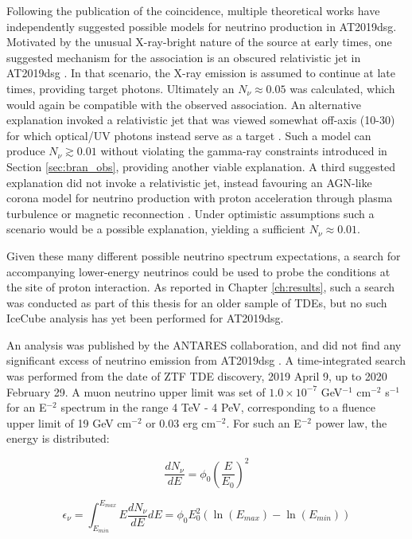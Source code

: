 Following the publication of the coincidence, multiple theoretical works have independently suggested possible models for neutrino production in AT2019dsg. Motivated by the unusual X-ray-bright nature of the source at early times, one suggested mechanism for the association is an obscured relativistic jet in AT2019dsg . In that scenario, the X-ray emission is assumed to continue at late times, providing target photons. Ultimately an $N_{\nu} \approx 0.05$ was calculated, which would again be compatible with the observed association. An alternative explanation invoked a relativistic jet that was viewed somewhat off-axis (10-30\arcdeg) for which optical/UV photons instead serve as a target . Such a model can produce $N_{\nu} \gtrsim 0.01$ without violating the gamma-ray constraints introduced in Section \ref{sec:bran_obs}, providing another viable explanation. A third suggested explanation did not invoke a relativistic jet, instead favouring an AGN-like corona model for neutrino production with proton acceleration through plasma turbulence or magnetic reconnection . Under optimistic assumptions such a scenario would be a possible explanation, yielding a sufficient $N_{\nu} \approx 0.01$.

Given these many different possible neutrino spectrum expectations, a search for accompanying lower-energy neutrinos could be used to probe the conditions at the site of proton interaction. As reported in Chapter \ref{ch:results}, such a search was conducted as part of this thesis for an older sample of TDEs, but no such IceCube analysis has yet been performed for AT2019dsg. 

An analysis was published by the ANTARES collaboration, and did not find any significant excess of neutrino emission from AT2019dsg . A time-integrated search was performed from the date of ZTF TDE discovery, 2019 April 9, up to 2020 February 29. A muon neutrino upper limit was set of $1.0 \times 10^{−7}$ GeV$^{−1}$ cm$^{−2}$ s$^{−1}$ for an E$^{-2}$ spectrum in the range 4 TeV - 4 PeV, corresponding to a fluence upper limit of 19 GeV cm$^{−2}$ or 0.03 erg cm$^{−2}$. For such an E$^{-2}$ power law, the energy is distributed:

\begin{equation}
	\frac{dN_{\nu}}{dE} = \phi_{0} \left(\frac{E}{E_{0}} \right) ^{2}
\end{equation}

\begin{equation}
\epsilon_{\nu} = \int^{E_{max}}_{E_{min}} E \frac{dN_{\nu}}{dE} dE = \phi_{0} E_{0}^{2} \left(\ln(E_{max}) - \ln({E_{min}})\right)
\end{equation}

